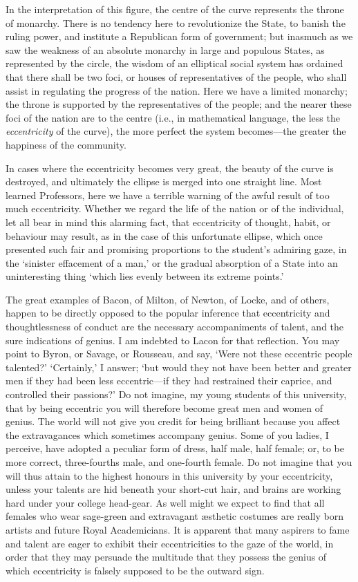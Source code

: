 \documentclass{jocg}
\begin{document}
In the interpretation of this figure, the centre of the curve represents
the throne of monarchy. There is no tendency here to revolutionize the
State, to banish the ruling power, and institute a Republican form of
government; but inasmuch as we saw the weakness of an absolute monarchy
in large and populous States, as represented by the circle, the wisdom
of an elliptical social system has ordained that there shall be two foci,
or houses of representatives of the people, who shall assist in regulating
the progress of the nation. Here we have a limited monarchy; the throne
is supported by the representatives of the people; and the nearer these
foci of the nation are to the centre (i.e., in mathematical language,
the less the \emph{eccentricity} of the curve), the more perfect the
system becomes—the greater the happiness of the community.

In cases where the eccentricity becomes very great, the beauty of the
curve is  destroyed, and ultimately the ellipse is merged into one
straight line. Most learned Professors, here we have a terrible warning
of the awful result of too much eccentricity. Whether we regard the life
of the nation or of the individual, let all bear in mind this alarming
fact, that eccentricity of thought, habit, or behaviour may result, as in
the case of this unfortunate ellipse, which once presented such fair and
promising proportions to the student’s admiring gaze, in the ‘sinister
effacement of a man,’ or the gradual absorption of a State into an
uninteresting thing ‘which lies evenly between its extreme points.’

The great examples of Bacon, of Milton, of Newton, of Locke, and
of others, happen to be directly opposed to the popular inference
that eccentricity and thoughtlessness of conduct are the necessary
accompaniments of talent, and the sure indications of genius. I am
indebted to Lacon for that reflection. You may point to Byron, or Savage,
or Rousseau, and say, ‘Were not these eccentric people  talented?’
‘Certainly,’ I answer; ‘but would they not have been better and
greater men if they had been less eccentric—if they had restrained
their caprice, and controlled their passions?’ Do not imagine, my
young students of this university, that by being eccentric you will
therefore become great men and women of genius. The world will not give
you credit for being brilliant because you affect the extravagances
which sometimes accompany genius. Some of you ladies, I perceive, have
adopted a peculiar form of dress, half male, half female; or, to be
more correct, three-fourths male, and one-fourth female. Do not imagine
that you will thus attain to the highest honours in this university by
your eccentricity, unless your talents are hid beneath your short-cut
hair, and brains are working hard under your college head-gear. As
well might we expect to find that all females who wear sage-green and
extravagant æsthetic costumes are really born artists and future Royal
Academicians. It is apparent that many aspirers to fame and talent
are eager  to exhibit their eccentricities to the gaze of the world,
in order that they may persuade the multitude that they possess the
genius of which eccentricity is falsely supposed to be the outward sign.
\end{document}
